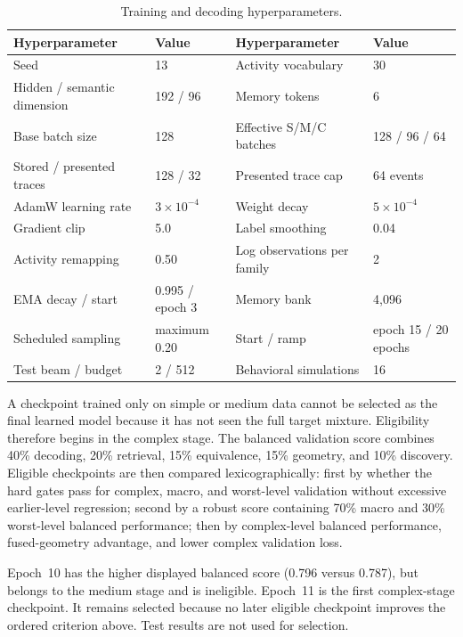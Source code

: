\documentclass[pdflatex,sn-basic]{sn-jnl}
\begin{document}
\begin{table}[!t]
\centering
\caption{Training and decoding hyperparameters.}
\label{tab:hyperparameters}
\small
\setlength{\tabcolsep}{3pt}
\begin{tabular}{@{}L{0.29\textwidth}L{0.19\textwidth}L{0.28\textwidth}L{0.18\textwidth}@{}}
\toprule
Hyperparameter & Value & Hyperparameter & Value \\
\midrule
Seed & 13 & Activity vocabulary & 30 \\
Hidden / semantic dimension & 192 / 96 & Memory tokens & 6 \\
Base batch size & 128 & Effective S/M/C batches & 128 / 96 / 64 \\
Stored / presented traces & 128 / 32 & Presented trace cap & 64 events \\
AdamW learning rate & $3\times10^{-4}$ & Weight decay & $5\times10^{-4}$ \\
Gradient clip & 5.0 & Label smoothing & 0.04 \\
Activity remapping & 0.50 & Log observations per family & 2 \\
EMA decay / start & 0.995 / epoch 3 & Memory bank & 4,096 \\
Scheduled sampling & maximum 0.20 & Start / ramp & epoch 15 / 20 epochs \\
Test beam / budget & 2 / 512 & Behavioral simulations & 16 \\
\bottomrule
\end{tabular}
\end{table}

A checkpoint trained only on simple or medium data cannot be selected as the final learned model because it has not seen the full target mixture. Eligibility therefore begins in the complex stage. The balanced validation score combines 40\% decoding, 20\% retrieval, 15\% equivalence, 15\% geometry, and 10\% discovery. Eligible checkpoints are then compared lexicographically: first by whether the hard gates pass for complex, macro, and worst-level validation without excessive earlier-level regression; second by a robust score containing 70\% macro and 30\% worst-level balanced performance; then by complex-level balanced performance, fused-geometry advantage, and lower complex validation loss.

Epoch~10 has the higher displayed balanced score (0.796 versus 0.787), but belongs to the medium stage and is ineligible. Epoch~11 is the first complex-stage checkpoint. It remains selected because no later eligible checkpoint improves the ordered criterion above. Test results are not used for selection.
\end{document}
